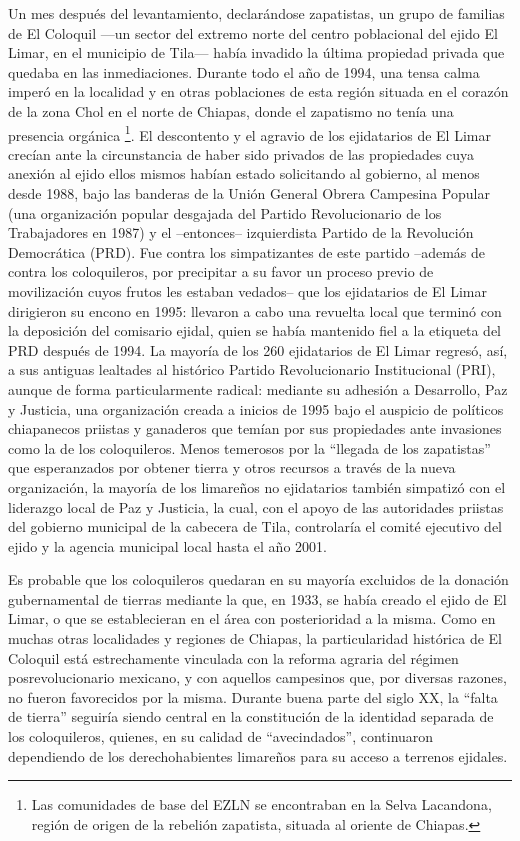 \documentclass[
  spanish,
  11pt,
  a4paper,
]{scrbook}
\begin{document}
Un mes después del levantamiento, declarándose zapatistas, un grupo de
familias de El Coloquil ---un sector del extremo norte del centro
poblacional del ejido El Limar, en el municipio de Tila--- había
invadido la última propiedad privada que quedaba en las inmediaciones.
Durante todo el año de 1994, una tensa calma imperó en la localidad y en
otras poblaciones de esta región situada en el corazón de la zona Chol
en el norte de Chiapas, donde el zapatismo no tenía una presencia
orgánica \footnote{Las comunidades de base del EZLN se encontraban en la
  Selva Lacandona, región de origen de la rebelión zapatista, situada al
  oriente de Chiapas.}. El descontento y el agravio de los ejidatarios
de El Limar crecían ante la circunstancia de haber sido privados de las
propiedades cuya anexión al ejido ellos mismos habían estado solicitando
al gobierno, al menos desde 1988, bajo las banderas de la Unión General
Obrera Campesina Popular (una organización popular desgajada del Partido
Revolucionario de los Trabajadores en 1987) y el --entonces--
izquierdista Partido de la Revolución Democrática (PRD). Fue contra los
simpatizantes de este partido --además de contra los coloquileros, por
precipitar a su favor un proceso previo de movilización cuyos frutos les
estaban vedados-- que los ejidatarios de El Limar dirigieron su encono
en 1995: llevaron a cabo una revuelta local que terminó con la
deposición del comisario ejidal, quien se había mantenido fiel a la
etiqueta del PRD después de 1994. La mayoría de los 260 ejidatarios de
El Limar regresó, así, a sus antiguas lealtades al histórico Partido
Revolucionario Institucional (PRI), aunque de forma particularmente
radical: mediante su adhesión a Desarrollo, Paz y Justicia, una
organización creada a inicios de 1995 bajo el auspicio de políticos
chiapanecos priistas y ganaderos que temían por sus propiedades ante
invasiones como la de los coloquileros. Menos temerosos por la ``llegada
de los zapatistas'' que esperanzados por obtener tierra y otros recursos
a través de la nueva organización, la mayoría de los limareños no
ejidatarios también simpatizó con el liderazgo local de Paz y Justicia,
la cual, con el apoyo de las autoridades priistas del gobierno municipal
de la cabecera de Tila, controlaría el comité ejecutivo del ejido y la
agencia municipal local hasta el año 2001.

Es probable que los coloquileros quedaran en su mayoría excluidos de la
donación gubernamental de tierras mediante la que, en 1933, se había
creado el ejido de El Limar, o que se establecieran en el área con
posterioridad a la misma. Como en muchas otras localidades y regiones de
Chiapas, la particularidad histórica de El Coloquil está estrechamente
vinculada con la reforma agraria del régimen posrevolucionario mexicano,
y con aquellos campesinos que, por diversas razones, no fueron
favorecidos por la misma. Durante buena parte del siglo XX, la ``falta
de tierra'' seguiría siendo central en la constitución de la identidad
separada de los coloquileros, quienes, en su calidad de ``avecindados'',
continuaron dependiendo de los derechohabientes limareños para su acceso
a terrenos ejidales.
\end{document}
